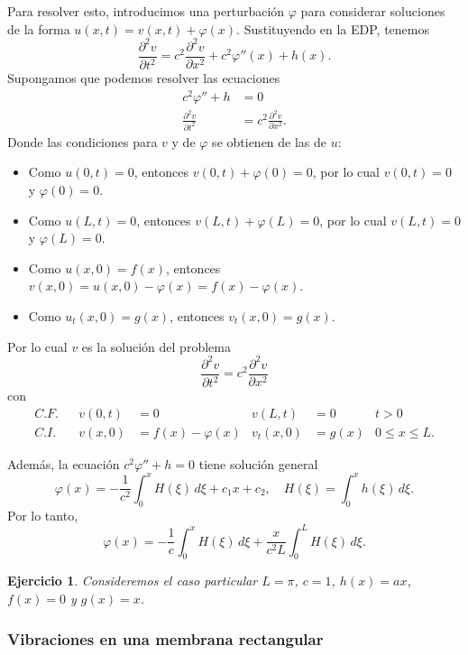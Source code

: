 \documentclass[11pt,letterpaper]{report}
\newtheorem{exe}[defn]{Ejercicio}
\newcommand\<{\langle}
\renewcommand\>{\rangle}
\renewcommand\phi\varphi
\begin{document}
Para resolver esto, introducimos una perturbación $\phi$ para
considerar soluciones de la forma $u(x,t)=v(x,t)+\phi(x)$.
Sustituyendo en la EDP, tenemos
\[
  \frac{\partial ^2v}{\partial t^2}
  = c^2 \frac{\partial ^2v}{\partial x^2} + c^2\phi''(x)+ h(x)
.\]
Supongamos que podemos resolver las ecuaciones
\begin{align*}
  c^2\phi''+h &= 0 \\
  \frac{\partial ^2v}{\partial t^2}
  &= c^2 \frac{\partial ^2v}{\partial x^2}.
\end{align*}
Donde las condiciones para $v$ y de $\phi$ se obtienen de las de $u$:
\begin{itemize}
  \item Como $u(0,t) = 0$, entonces $v(0,t)+\phi(0)=0$, por lo cual
    $v(0,t)=0$ y $\phi(0)=0$.
  \item Como $u(L,t)=0$, entonces $v(L,t)+\phi(L)=0$, por lo cual
    $v(L,t)=0$ y $\phi(L)=0$.
  \item Como $u(x,0)=f(x)$, entonces
    $v(x,0)=u(x,0)-\phi(x)=f(x)-\phi(x)$.
  \item Como $u_t(x,0)=g(x)$, entonces $v_t(x,0)=g(x)$.
\end{itemize}
Por lo cual $v$ es la solución del problema
\[
  \frac{\partial ^2v}{\partial t^2}
  = c^2 \frac{\partial ^2v}{\partial x^2}
\]
con
\begin{align*}
  C.F.&& v(0,t)&=0 & v(L,t)&=0 & t>0 \\
  C.I.&& v(x,0)&=f(x)-\phi(x) & v_t(x,0)&=g(x) & 0\leq x\leq L.
\end{align*}

Además, la ecuación $c^2\phi''+h=0$ tiene solución general
\[
  \phi(x) = -\frac{1}{c^2}\int_{0}^{x}H(\xi)\,d\xi+c_1x+c_2,
  \quad H(\xi) = \int_{0}^{x}h(\xi)\,d\xi
.\]
Por lo tanto,
\[
  \phi(x)=-\frac{1}{c}\int_{0}^{x}H(\xi)\,d\xi
  + \frac{x}{c^2L}\int_{0}^{L}H(\xi)\,d\xi
.\]

\begin{exe}
  Consideremos el caso particular $L=\pi$, $c=1$, $h(x)=ax$, $f(x)=0$
  y $g(x)=x$.
\end{exe}

\subsubsection{Vibraciones en una membrana rectangular}


\end{document}
